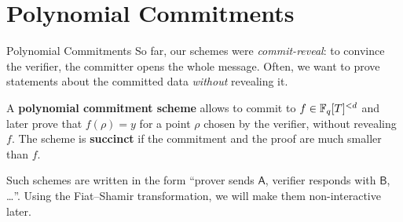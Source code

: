 \documentclass{zkdl-presentation-template}
\begin{document}
    \section{Polynomial Commitments}

    \begin{frame}{Polynomial Commitments}
        So far, our schemes were \emph{commit-reveal}: to convince the verifier, the committer opens the whole message.
        Often, we want to prove statements about the committed data \emph{without} revealing it.
        \pause

        \begin{definition}[informal]
            A \textbf{polynomial commitment scheme} allows to commit to $f \in \mathbb{F}_q[T]^{<d}$ and later prove that $f(\rho) = y$ for a point $\rho$ chosen by the verifier, without revealing $f$.
            The scheme is \textbf{succinct} if the commitment and the proof are much smaller than $f$.
        \end{definition}
        \pause

        \begin{remark}
            Such schemes are written in the form ``prover sends $\mathsf{A}$, verifier responds with $\mathsf{B}$, \dots''.
            Using the Fiat--Shamir transformation, we will make them non-interactive later.
        \end{remark}
    \end{frame}
\end{document}
